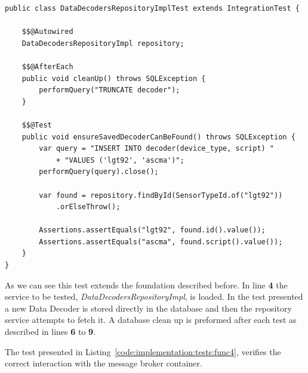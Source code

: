 \begin{lstlisting}[style=Java, caption=Functional Test - Database Interaction - \textbf{Data Decoder Master Backend}, label={code:implementation:tests:func3}]
public class DataDecodersRepositoryImplTest extends IntegrationTest {

    $$@Autowired
    DataDecodersRepositoryImpl repository;
    
    $$@AfterEach
    public void cleanUp() throws SQLException {
        performQuery("TRUNCATE decoder");
    }

    $$@Test
    public void ensureSavedDecoderCanBeFound() throws SQLException {
        var query = "INSERT INTO decoder(device_type, script) "
            + "VALUES ('lgt92', 'ascma')";
        performQuery(query).close();

        var found = repository.findById(SensorTypeId.of("lgt92"))
            .orElseThrow();

        Assertions.assertEquals("lgt92", found.id().value());
        Assertions.assertEquals("ascma", found.script().value());
    }
}
\end{lstlisting}

As we can see this test extends the foundation described before. In line \textbf{4} the service to be tested, \textit{DataDecodersRepositoryImpl}, is loaded. In the test presented a new Data Decoder is stored directly in the database and then the repository service attempts to fetch it. A database clean up is preformed after each test as described in lines \textbf{6} to \textbf{9}.

The test presented in Listing~\ref{code:implementation:tests:func4}, verifies the correct interaction with the message broker container.

